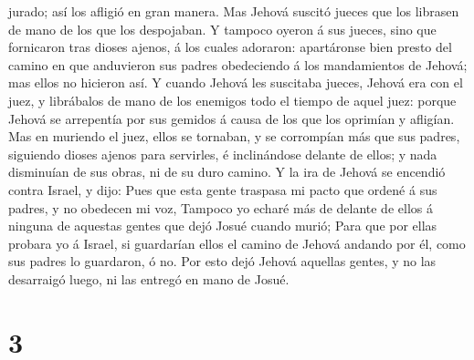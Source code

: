 jurado; así los afligió en gran manera.  Mas Jehová suscitó
jueces que los librasen de mano de los que los despojaban. 
Y tampoco oyeron á sus jueces, sino que fornicaron tras dioses ajenos, á
los cuales adoraron: apartáronse bien presto del camino en que
anduvieron sus padres obedeciendo á los mandamientos de Jehová; mas
ellos no hicieron así.  Y cuando Jehová les suscitaba
jueces, Jehová era con el juez, y librábalos de mano de los enemigos
todo el tiempo de aquel juez: porque Jehová se arrepentía por sus
gemidos á causa de los que los oprimían y afligían.  Mas en
muriendo el juez, ellos se tornaban, y se corrompían más que sus padres,
siguiendo dioses ajenos para servirles, é inclinándose delante de ellos;
y nada disminuían de sus obras, ni de su duro camino.  Y la
ira de Jehová se encendió contra Israel, y dijo: Pues que esta gente
traspasa mi pacto que ordené á sus padres, y no obedecen mi voz,
 Tampoco yo echaré más de delante de ellos á ninguna de
aquestas gentes que dejó Josué cuando murió;  Para que por
ellas probara yo á Israel, si guardarían ellos el camino de Jehová
andando por él, como sus padres lo guardaron, ó no.  Por
esto dejó Jehová aquellas gentes, y no las desarraigó luego, ni las
entregó en mano de Josué.

\hypertarget{section-2}{%
\section{3}\label{section-2}}

